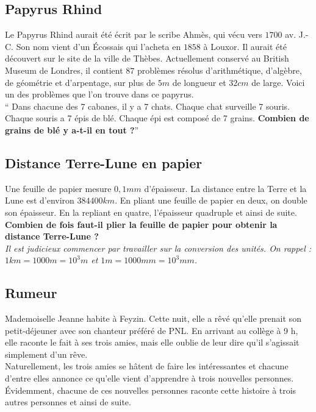 \documentclass[10t]{article}
\begin{document}
\subsection*{Papyrus Rhind}
Le Papyrus Rhind aurait été écrit par le scribe Ahmès, qui vécu vers $1700$ av. J.-C. Son nom vient d'un Écossais qui l'acheta en $1858$ à Louxor. Il aurait été découvert sur le site de la ville de Thèbes. Actuellement conservé au British Museum de Londres, il contient $87$ problèmes résolus d'arithmétique, d'algèbre, de géométrie et d'arpentage, sur plus de $5m$ de longueur et $32cm$ de large. Voici un des problèmes que l’on trouve dans ce papyrus.\\

`` Dans chacune des 7 cabanes, il y a 7 chats. Chaque chat surveille 7 souris. Chaque souris a 7 épis de blé. Chaque épi est composé de 7 grains. \textbf{Combien de grains de blé y a-t-il en tout ?}''

\subsection*{Distance Terre-Lune en papier}
Une feuille de papier mesure $0,1 mm$ d’épaisseur. La distance entre la Terre et la Lune est d’environ $384 400 km$. En pliant une feuille de papier en deux, on double son épaisseur. En la repliant en quatre, l’épaisseur quadruple et ainsi de suite.\\
\textbf{Combien de fois faut-il plier la feuille de papier pour obtenir la distance Terre-Lune ?}\\

\textit{Il est judicieux commencer par travailler sur la conversion des unités. On rappel : $1km = 1 000m = 10^3 m$ et $1m = 1 000 mm = 10^3 mm$.}

\subsection*{Rumeur}

Mademoiselle Jeanne habite à Feyzin. Cette nuit, elle a rêvé qu’elle prenait son petit-déjeuner avec son chanteur préféré de PNL. En arrivant au collège à 9 h, elle raconte le fait à ses trois amies, mais elle oublie de leur dire qu'il s'agissait simplement d'un rêve.\\

Naturellement, les trois amies se hâtent de faire les intéressantes et chacune d’entre elles annonce ce qu’elle vient d’apprendre à trois nouvelles personnes. Évidemment, chacune de ces nouvelles personnes raconte cette histoire à trois autres personnes et ainsi de suite.\\
\end{document}

